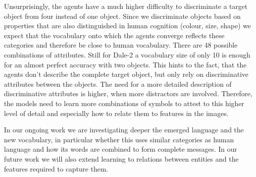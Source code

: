 \documentclass[11pt]{article}
\begin{document}
Unsurprisingly, the agents have a much higher difficulty to discriminate a target object from four instead of one object.
Since we discriminate objects based on properties that are also distinguished in human cognition (colour, size, shape) we expect that the vocabulary onto which the agents converge reflects these categories and therefore be close to human vocabulary.
There are 48 possible combinations of attributes.
Still for Dale-2 a vocabulary size of only 10 is enough for an almost perfect accuracy with two objects.
This hints to the fact, that the agents don't describe the complete target object, but only rely on discriminative attributes between the objects.
The need for a more detailed description of discriminative attributes is higher, when more distractors are involved.
Therefore, the models need to learn more combinations of symbols to attest to this higher level of detail and especially how to relate them to features in the images.


In our ongoing work we are investigating deeper the emerged language and the new vocabulary,
in particular whether
this uses similar categories as human language and how its words are combined to form complete messages.
In our future work we will also extend learning to relations between entities and the features required to capture them.



\appendix
\end{document}
